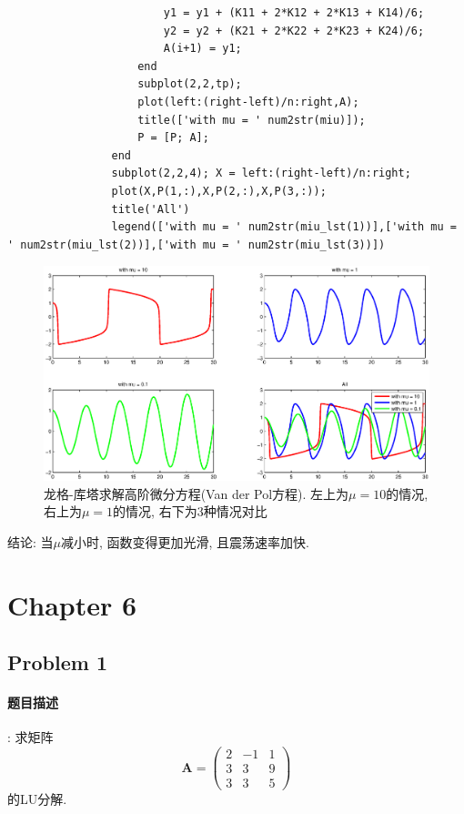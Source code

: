 \documentclass{article}
\begin{document}
\begin{CJK*}{UTF8}{song}
\begin{lstlisting}
					 	y1 = y1 + (K11 + 2*K12 + 2*K13 + K14)/6;
					 	y2 = y2 + (K21 + 2*K22 + 2*K23 + K24)/6;
					 	A(i+1) = y1;
				 	end
				 	subplot(2,2,tp);
				 	plot(left:(right-left)/n:right,A);
				 	title(['with mu = ' num2str(miu)]);
				 	P = [P; A];
			 	end
			 	subplot(2,2,4); X = left:(right-left)/n:right;
			 	plot(X,P(1,:),X,P(2,:),X,P(3,:));
			 	title('All')
			 	legend(['with mu = ' num2str(miu_lst(1))],['with mu = ' num2str(miu_lst(2))],['with mu = ' num2str(miu_lst(3))])
			 \end{lstlisting}
			 \begin{figure}[H]
			 	\centering
			 	\includegraphics[width=1.0\textwidth]{../chapter5_2_1.eps}
			 	\caption{龙格-库塔求解高阶微分方程(Van der Pol方程). 左上为$\mu = 10$的情况, 右上为$\mu = 1$的情况,
			 	右下为$3$种情况对比}
			 	\label{img_chapter5_2_1}
			 \end{figure}
		 	结论: 当$\mu$减小时, 函数变得更加光滑, 且震荡速率加快.
	\section{Chapter 6}
		\subsection{Problem 1}
			\paragraph{题目描述}
			:\newline
				求矩阵
				$$ \mathbf{A} = 
					\left(
					\begin{matrix}
						2 & -1 & 1 \\
						3 &  3 & 9 \\
						3 &  3 & 5
					\end{matrix}
					\right)$$
				的LU分解.

\end{CJK*}
\end{document}
